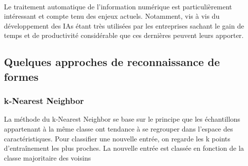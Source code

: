 \documentclass[a4paper]{article}
\begin{document}
		\paragraph{}
			Le traitement automatique de l'information numérique est particulièrement intéressant et  compte tenu des enjeux actuels. Notamment, vis à vis du développement des IAs étant très utilisées par les entreprises 
			sachant le gain de temps et de productivité considérable que ces dernières peuvent leurs apporter.


		\subsection{Quelques approches de reconnaissance de formes}
			\subsubsection{k-Nearest Neighbor}
				La méthode du k-Nearest Neighbor se base sur le principe que les échantillons appartenant à la même classe ont tendance à se regrouper dans l'espace des caractéristiques.
				Pour classifier une nouvelle entrée, on regarde les k points d'entraînement les plus proches. La nouvelle entrée est classée en fonction de la classe majoritaire des voisins
\end{document}
